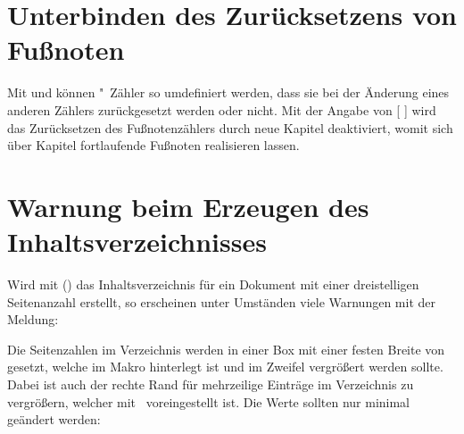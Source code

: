 \section{Unterbinden des Zurücksetzens von Fußnoten}%
%
%
%
Mit  und  können 
"~Zähler so umdefiniert werden, dass sie bei der Änderung eines 
anderen Zählers zurückgesetzt werden oder nicht. Mit der Angabe von 
[%
] wird das Zurücksetzen des Fußnotenzählers durch neue Kapitel 
deaktiviert, womit sich über Kapitel fortlaufende Fußnoten 
realisieren lassen.



\section{Warnung beim Erzeugen des Inhaltsverzeichnisses}
%
%
Wird mit () das Inhaltsverzeichnis 
für ein Dokument mit einer dreistelligen Seitenanzahl erstellt, so erscheinen 
unter Umständen viele Warnungen mit der Meldung:
%
\begin{quoting}
\end{quoting}
%
Die Seitenzahlen im Verzeichnis werden in einer Box mit einer festen Breite 
von~\PValue{1.55em} gesetzt, welche im Makro  hinterlegt ist 
und im Zweifel vergrößert werden sollte. Dabei ist auch der rechte Rand für 
mehrzeilige Einträge im Verzeichnis  zu vergrößern, welcher 
mit~\PValue{2.55em} voreingestellt ist. Die Werte sollten nur minimal geändert 
werden:
%
\begin{quoting}
\begin{Code}
\makeatletter
\renewcommand*{\@pnumwidth}{1.7em}\renewcommand*{\@tocrmarg}{2.7em}
\makeatother
\end{Code}
\end{quoting}



